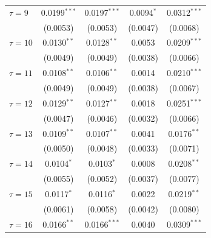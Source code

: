 \begin{tabular}{lcccc}
   $\tau = 9$                                   & 0.0199$^{***}$  & 0.0197$^{***}$         & 0.0094$^{*}$                & 0.0312$^{***}$\\   
                                                & (0.0053)        & (0.0053)               & (0.0047)                    & (0.0068)\\   
   $\tau = 10$                                  & 0.0130$^{**}$   & 0.0128$^{**}$          & 0.0053                      & 0.0209$^{***}$\\   
                                                & (0.0049)        & (0.0049)               & (0.0038)                    & (0.0066)\\   
   $\tau = 11$                                  & 0.0108$^{**}$   & 0.0106$^{**}$          & 0.0014                      & 0.0210$^{***}$\\   
                                                & (0.0049)        & (0.0049)               & (0.0038)                    & (0.0067)\\   
   $\tau = 12$                                  & 0.0129$^{**}$   & 0.0127$^{**}$          & 0.0018                      & 0.0251$^{***}$\\   
                                                & (0.0047)        & (0.0046)               & (0.0032)                    & (0.0066)\\   
   $\tau = 13$                                  & 0.0109$^{**}$   & 0.0107$^{**}$          & 0.0041                      & 0.0176$^{**}$\\   
                                                & (0.0050)        & (0.0048)               & (0.0033)                    & (0.0071)\\   
   $\tau = 14$                                  & 0.0104$^{*}$    & 0.0103$^{*}$           & 0.0008                      & 0.0208$^{**}$\\   
                                                & (0.0055)        & (0.0052)               & (0.0037)                    & (0.0077)\\   
   $\tau = 15$                                  & 0.0117$^{*}$    & 0.0116$^{*}$           & 0.0022                      & 0.0219$^{**}$\\   
                                                & (0.0061)        & (0.0058)               & (0.0042)                    & (0.0080)\\   
   $\tau = 16$                                  & 0.0166$^{**}$   & 0.0166$^{***}$         & 0.0040                      & 0.0309$^{***}$\\   

\end{tabular}
